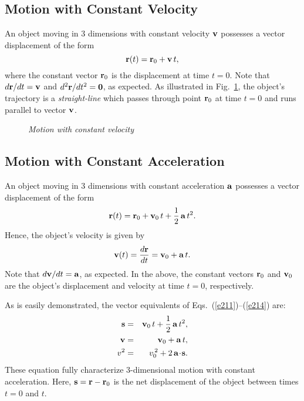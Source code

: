 \subsection{Motion with Constant Velocity}
An object moving in 3 dimensions with constant velocity ${\bf v}$ possesses
a vector displacement of the form
\begin{equation}
{\bf r}(t) = {\bf r}_0 + {\bf v}\,t,
\end{equation}
where the constant vector ${\bf r}_0$ is the displacement at time $t=0$. Note
that $d{\bf r}/dt = {\bf v}$ and $d^2{\bf r}/dt^2={\bf 0}$, as expected.
As illustrated in Fig.~\ref{f14}, the object's trajectory  is a {\em straight-line}
which passes through point ${\bf r}_0$ at time $t=0$ and runs parallel to vector
${\bf v}$. 

\begin{figure}
\epsfysize=2.5in
\centerline{}
\caption{\em Motion with constant velocity}\label{f14}   
\end{figure}

\subsection{Motion with Constant Acceleration}\label{s2ed}
An object moving in 3 dimensions with constant acceleration ${\bf a}$
possesses a vector displacement of the form
\begin{equation}
{\bf r}(t) = {\bf r}_0 + {\bf v}_0\,t + \frac{1}{2}\,{\bf a}\,t^2.
\end{equation}
Hence, the object's velocity is given by
\begin{equation}
{\bf v}(t) = \frac{d{\bf r}}{dt}= {\bf v}_0 + {\bf a}\,t.
\end{equation}
Note that $d{\bf v}/dt ={\bf a}$, as expected. In the above,
the constant vectors ${\bf r}_0$ and ${\bf v}_0$ are the object's displacement and velocity at time
$t=0$, respectively.

As is easily demonstrated, the vector equivalents of Eqs.~(\ref{e211})--(\ref{e214}) are:
\begin{eqnarray}
{\bf s} &=& {\bf v}_0\,t + \frac{1}{2}\,{\bf a}\,t^2,\label{e335}\\
{\bf v} &=& {\bf v}_0 + {\bf a}\,t,\label{e337}\\
v^2 &=& v_0^{\,2} + 2\,{\bf a}\!\cdot\!{\bf s}.\label{e338}
\end{eqnarray}
These equation fully characterize 3-dimensional motion with constant acceleration.
Here, ${\bf s} = {\bf r}-{\bf r}_0$ is the net displacement of the object
between times $t=0$ and $t$.

